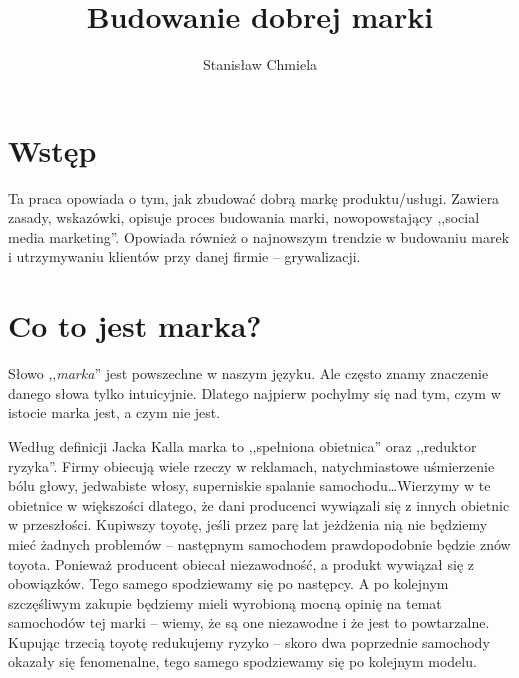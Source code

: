 \documentclass [a4paper, 11pt]{article}
\author{Stanisław Chmiela}
\title{Budowanie dobrej marki}
\begin{document}
\maketitle
\tableofcontents
\clearpage
\section{Wstęp}
Ta praca opowiada o tym, jak zbudować dobrą markę produktu/usługi. Zawiera zasady, wskazówki, opisuje proces budowania marki, nowopowstający ,,social media marketing''. Opowiada również o najnowszym trendzie w budowaniu marek i utrzymywaniu klientów przy danej firmie -- grywalizacji.

\section{Co to jest marka?}
Słowo ,,\emph{marka}'' jest powszechne w naszym języku. Ale często znamy znaczenie danego słowa tylko intuicyjnie. Dlatego najpierw pochylmy się nad tym, czym w istocie marka jest, a czym nie jest.

Według definicji Jacka Kalla\cite{kall} marka to ,,spełniona obietnica'' oraz ,,reduktor ryzyka''. Firmy obiecują wiele rzeczy w reklamach, natychmiastowe uśmierzenie bólu głowy, jedwabiste włosy, superniskie spalanie samochodu\dots Wierzymy w te obietnice w większości dlatego, że dani producenci wywiązali się z innych obietnic w przeszłości. Kupiwszy toyotę, jeśli przez parę lat jeżdżenia nią nie będziemy mieć żadnych problemów -- następnym samochodem prawdopodobnie będzie znów toyota. Ponieważ producent obiecał niezawodność, a produkt wywiązał się z obowiązków. Tego samego spodziewamy się po następcy. A po kolejnym szczęśliwym zakupie będziemy mieli wyrobioną mocną opinię na temat samochodów tej marki -- wiemy, że są one niezawodne i że jest to powtarzalne. Kupując trzecią toyotę redukujemy ryzyko -- skoro dwa poprzednie samochody okazały się fenomenalne, tego samego spodziewamy się po kolejnym modelu.
\end{document}
